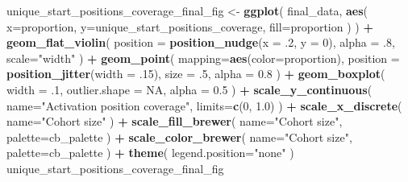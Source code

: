 \documentclass[]{book}
\newenvironment{Shaded}{\begin{snugshade}}{\end{snugshade}}
\newcommand{\DataTypeTok}[1]{\textcolor[rgb]{0.13,0.29,0.53}{#1}}
\newcommand{\DecValTok}[1]{\textcolor[rgb]{0.00,0.00,0.81}{#1}}
\newcommand{\FloatTok}[1]{\textcolor[rgb]{0.00,0.00,0.81}{#1}}
\newcommand{\KeywordTok}[1]{\textcolor[rgb]{0.13,0.29,0.53}{\textbf{#1}}}
\newcommand{\NormalTok}[1]{#1}
\newcommand{\OperatorTok}[1]{\textcolor[rgb]{0.81,0.36,0.00}{\textbf{#1}}}
\newcommand{\OtherTok}[1]{\textcolor[rgb]{0.56,0.35,0.01}{#1}}
\newcommand{\StringTok}[1]{\textcolor[rgb]{0.31,0.60,0.02}{#1}}
\begin{document}
\begin{Shaded}
\begin{Highlighting}[]
\NormalTok{unique_start_positions_coverage_final_fig <-}\StringTok{ }\KeywordTok{ggplot}\NormalTok{(}
\NormalTok{    final_data,}
    \KeywordTok{aes}\NormalTok{(}
      \DataTypeTok{x=}\NormalTok{proportion,}
      \DataTypeTok{y=}\NormalTok{unique_start_positions_coverage,}
      \DataTypeTok{fill=}\NormalTok{proportion}
\NormalTok{    )}
\NormalTok{  ) }\OperatorTok{+}
\StringTok{  }\KeywordTok{geom_flat_violin}\NormalTok{(}
    \DataTypeTok{position =} \KeywordTok{position_nudge}\NormalTok{(}\DataTypeTok{x =} \FloatTok{.2}\NormalTok{, }\DataTypeTok{y =} \DecValTok{0}\NormalTok{),}
    \DataTypeTok{alpha =} \FloatTok{.8}\NormalTok{,}
    \DataTypeTok{scale=}\StringTok{"width"}
\NormalTok{  ) }\OperatorTok{+}
\StringTok{  }\KeywordTok{geom_point}\NormalTok{(}
    \DataTypeTok{mapping=}\KeywordTok{aes}\NormalTok{(}\DataTypeTok{color=}\NormalTok{proportion),}
    \DataTypeTok{position =} \KeywordTok{position_jitter}\NormalTok{(}\DataTypeTok{width =} \FloatTok{.15}\NormalTok{),}
    \DataTypeTok{size =} \FloatTok{.5}\NormalTok{,}
    \DataTypeTok{alpha =} \FloatTok{0.8}
\NormalTok{  ) }\OperatorTok{+}
\StringTok{  }\KeywordTok{geom_boxplot}\NormalTok{(}
    \DataTypeTok{width =} \FloatTok{.1}\NormalTok{,}
    \DataTypeTok{outlier.shape =} \OtherTok{NA}\NormalTok{,}
    \DataTypeTok{alpha =} \FloatTok{0.5}
\NormalTok{  ) }\OperatorTok{+}
\StringTok{  }\KeywordTok{scale_y_continuous}\NormalTok{(}
    \DataTypeTok{name=}\StringTok{"Activation position coverage"}\NormalTok{,}
    \DataTypeTok{limits=}\KeywordTok{c}\NormalTok{(}\DecValTok{0}\NormalTok{, }\FloatTok{1.0}\NormalTok{)}
\NormalTok{  ) }\OperatorTok{+}
\StringTok{  }\KeywordTok{scale_x_discrete}\NormalTok{(}
    \DataTypeTok{name=}\StringTok{"Cohort size"}
\NormalTok{  ) }\OperatorTok{+}
\StringTok{  }\KeywordTok{scale_fill_brewer}\NormalTok{(}
    \DataTypeTok{name=}\StringTok{"Cohort size"}\NormalTok{,}
    \DataTypeTok{palette=}\NormalTok{cb_palette}
\NormalTok{  ) }\OperatorTok{+}
\StringTok{  }\KeywordTok{scale_color_brewer}\NormalTok{(}
    \DataTypeTok{name=}\StringTok{"Cohort size"}\NormalTok{,}
    \DataTypeTok{palette=}\NormalTok{cb_palette}
\NormalTok{  ) }\OperatorTok{+}
\StringTok{  }\KeywordTok{theme}\NormalTok{(}
    \DataTypeTok{legend.position=}\StringTok{"none"}
\NormalTok{  )}
\NormalTok{unique_start_positions_coverage_final_fig}
\end{Highlighting}
\end{Shaded}
\end{document}
